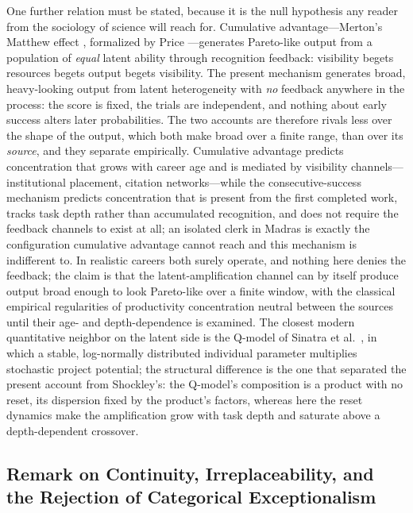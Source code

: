 \documentclass{article}
\begin{document}
One further relation must be stated, because it is the null hypothesis
any reader from the sociology of science will reach for. Cumulative
advantage---Merton's Matthew effect \cite{merton1968matthew}, formalized
by Price \cite{price1976cumulative}---generates Pareto-like output from
a population of \emph{equal} latent ability through recognition
feedback: visibility begets resources begets output begets visibility.
The present mechanism generates broad, heavy-looking output from latent heterogeneity with \emph{no} feedback anywhere in the process: the score
is fixed, the trials are independent, and nothing about early success
alters later probabilities. The two accounts are therefore rivals less over the shape of the output, which both make broad over a finite range, than over its \emph{source}, and they separate empirically. Cumulative advantage predicts
concentration that grows with career age and is mediated by visibility
channels---institutional placement, citation networks---while the
consecutive-success mechanism predicts concentration that is present
from the first completed work, tracks task depth rather than accumulated
recognition, and does not require the feedback channels to exist at all;
an isolated clerk in Madras is exactly the configuration cumulative
advantage cannot reach and this mechanism is indifferent to. In
realistic careers both surely operate, and nothing here denies the
feedback; the claim is that the latent-amplification channel can by itself produce output broad enough to look Pareto-like over a finite window, with the classical empirical regularities of
productivity concentration \cite{lotka1926, oboyle2012} neutral between
the sources until their age- and depth-dependence is examined. The
closest modern quantitative neighbor on the latent side is the Q-model
of Sinatra et al.\ \cite{sinatra2016quantifying}, in which a stable,
log-normally distributed individual parameter multiplies stochastic
project potential; the structural difference is the one that separated
the present account from Shockley's: the Q-model's composition is a product with no reset, its dispersion fixed by the product's factors, whereas here the reset dynamics make the amplification grow with task depth and saturate above a depth-dependent crossover.

\subsection{Remark on Continuity, Irreplaceability, and the Rejection of
            Categorical Exceptionalism}\label{ssec:exceptionalism}
\end{document}
